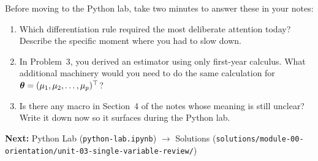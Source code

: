 \documentclass[11pt, letterpaper]{article}
\begin{document}
\begin{tcolorbox}[
  colback=ts-light,
  colframe=ts-green,
  title=Reflection,
  fonttitle=\bfseries\color{ts-green}
]
Before moving to the Python lab, take two minutes to answer these in your notes:

\begin{enumerate}
  \item Which differentiation rule required the most deliberate attention today?
  Describe the specific moment where you had to slow down.
  \item In Problem~3, you derived an estimator using only first-year calculus.
  What additional machinery would you need to do the same calculation for
  $\bm{\theta} = (\mu_1, \mu_2, \ldots, \mu_p)^{\top}$?
  \item Is there any macro in Section~4 of the notes whose meaning is still
  unclear? Write it down now so it surfaces during the Python lab.
\end{enumerate}

\medskip
\textbf{Next:} Python Lab (\texttt{python-lab.ipynb})
$\to$ Solutions (\texttt{solutions/module-00-orientation/unit-03-single-variable-review/})
\end{tcolorbox}


\end{document}

